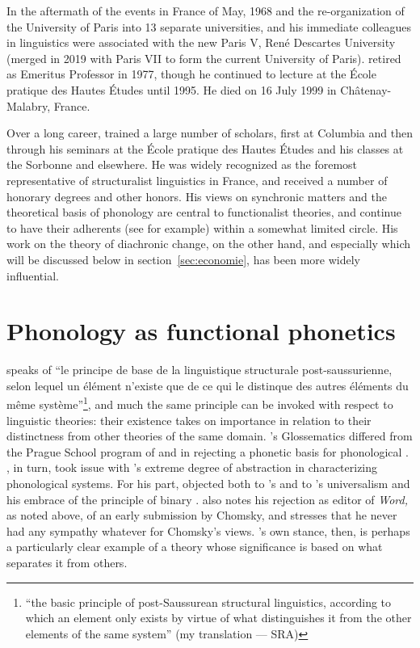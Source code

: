 In the aftermath of the events in France of May, 1968 and the
re-organization of the University of Paris into 13 separate
universities, {\Martinet} and his immediate colleagues in linguistics
were associated with the new Paris V, René Descartes University
(merged in 2019 with Paris VII to form the current University of
Paris). {\Martinet} retired as Emeritus Professor in 1977, though he
continued to lecture at the École pratique des Hautes Études until
1995. He died on 16 July 1999 in Châtenay-Malabry, France.

Over a long career, {\Martinet} trained a large number of scholars, first
at Colum\-bia and then through his seminars at the École pratique des
Hautes Études and his classes at the Sorbonne and elsewhere. He was
widely recognized as the foremost representative of structuralist
linguistics in France, and received a number of honorary degrees and
other honors. His views on synchronic matters and the theoretical
basis of phonology are central to functionalist theories, and continue
to have their adherents (see
\citealt{akamatsu92:essentials,akamatsu09:martinet} for example)
within a somewhat limited circle. His work on the theory of diachronic
change, on the other hand, and especially
\citealt{martinet52:function.structure,martinet55:economie} which will
be discussed below in section~\ref{sec:economie}, has been more widely
influential.

\section{Phonology as functional phonetics}
\label{sec:functional-phonetics}

\citet[93]{martinet93:memoires} speaks of ``le principe de base de la
linguistique structurale post-saussurienne, selon lequel un élément
n'existe que de ce qui le distinque des autres éléments du même
système''\footnote{``the basic principle of post-Saussurean structural
  linguistics, according to which an element only exists by virtue of
  what distinguishes it from the other elements of the same system''
  (my translation --- SRA)}, and much the same principle can be
invoked with respect to linguistic theories: their existence takes on
importance in relation to their distinctness from other theories of
the same domain. {\Hjelmslev}'s Glossematics differed from the Prague
School program of {\Trubetzkoy} and {\Jakobson} in rejecting a phonetic
basis for phonological . {\Jakobson}, in turn, took issue with
{\Hjelmslev}'s extreme degree of abstraction in characterizing
phonological systems. For his part, {\Martinet} objected both to
{\Hjelmslev}'s  and to {\Jakobson}'s universalism and his
embrace of the principle of binary . {\Martinet} also notes
his rejection as editor of \textsl{Word,} as noted above, of an early
submission by Chomsky, and stresses that he never had any sympathy
whatever for Chomsky's views. {\Martinet}'s own stance, then, is perhaps
a particularly clear example of a theory whose significance is based
on what separates it from others.

